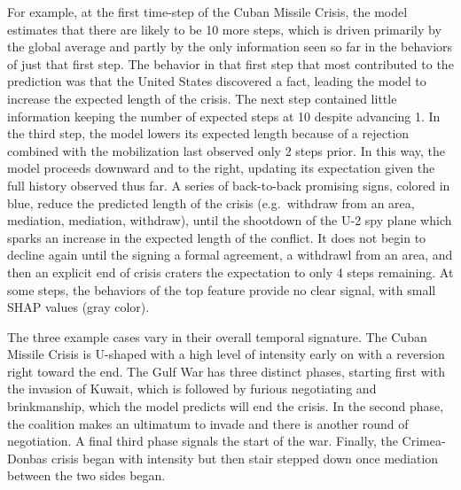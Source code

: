 \documentclass[
]{article}
\begin{document}
For example, at the first time-step of the Cuban Missile Crisis, the
model estimates that there are likely to be 10 more steps, which is
driven primarily by the global average and partly by the only
information seen so far in the behaviors of just that first step. The
behavior in that first step that most contributed to the prediction was
that the United States discovered a fact, leading the model to increase
the expected length of the crisis. The next step contained little
information keeping the number of expected steps at 10 despite advancing
1. In the third step, the model lowers its expected length because of a
rejection combined with the mobilization last observed only 2 steps
prior. In this way, the model proceeds downward and to the right,
updating its expectation given the full history observed thus far. A
series of back-to-back promising signs, colored in blue, reduce the
predicted length of the crisis (e.g.~withdraw from an area, mediation,
mediation, withdraw), until the shootdown of the U-2 spy plane which
sparks an increase in the expected length of the conflict. It does not
begin to decline again until the signing a formal agreement, a withdrawl
from an area, and then an explicit end of crisis craters the expectation
to only 4 steps remaining. At some steps, the behaviors of the top
feature provide no clear signal, with small SHAP values (gray color).

The three example cases vary in their overall temporal signature. The
Cuban Missile Crisis is U-shaped with a high level of intensity early on
with a reversion right toward the end. The Gulf War has three distinct
phases, starting first with the invasion of Kuwait, which is followed by
furious negotiating and brinkmanship, which the model predicts will end
the crisis. In the second phase, the coalition makes an ultimatum to
invade and there is another round of negotiation. A final third phase
signals the start of the war. Finally, the Crimea-Donbas crisis began
with intensity but then stair stepped down once mediation between the
two sides began.
\end{document}
